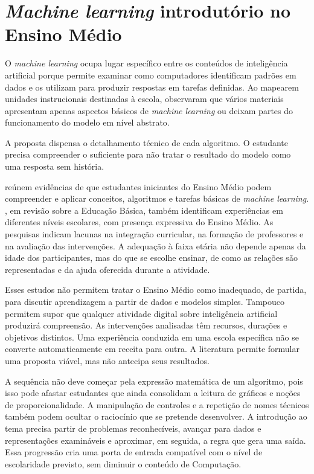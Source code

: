 \section{\textit{Machine learning} introdutório no Ensino Médio}

O \textit{machine learning} ocupa lugar específico entre os conteúdos de inteligência artificial porque permite examinar como computadores identificam padrões em dados e os utilizam para produzir respostas em tarefas definidas. Ao mapearem unidades instrucionais destinadas à escola,  observaram que vários materiais apresentam apenas aspectos básicos de \textit{machine learning} ou deixam partes do funcionamento do modelo em nível abstrato.

A proposta dispensa o detalhamento técnico de cada algoritmo. O estudante precisa compreender o suficiente para não tratar o resultado do modelo como uma resposta sem história.

 reúnem evidências de que estudantes iniciantes do Ensino Médio podem compreender e aplicar conceitos, algoritmos e tarefas básicas de \textit{machine learning}. , em revisão sobre a Educação Básica, também identificam experiências em diferentes níveis escolares, com presença expressiva do Ensino Médio. As pesquisas indicam lacunas na integração curricular, na formação de professores e na avaliação das intervenções. A adequação à faixa etária não depende apenas da idade dos participantes, mas do que se escolhe ensinar, de como as relações são representadas e da ajuda oferecida durante a atividade.

Esses estudos não permitem tratar o Ensino Médio como inadequado, de partida, para discutir aprendizagem a partir de dados e modelos simples. Tampouco permitem supor que qualquer atividade digital sobre inteligência artificial produzirá compreensão. As intervenções analisadas têm recursos, durações e objetivos distintos. Uma experiência conduzida em uma escola específica não se converte automaticamente em receita para outra. A literatura permite formular uma proposta viável, mas não antecipa seus resultados.

A sequência não deve começar pela expressão matemática de um algoritmo, pois isso pode afastar estudantes que ainda consolidam a leitura de gráficos e noções de proporcionalidade. A manipulação de controles e a repetição de nomes técnicos também podem ocultar o raciocínio que se pretende desenvolver. A introdução ao tema precisa partir de problemas reconhecíveis, avançar para dados e representações examináveis e aproximar, em seguida, a regra que gera uma saída. Essa progressão cria uma porta de entrada compatível com o nível de escolaridade previsto, sem diminuir o conteúdo de Computação.

